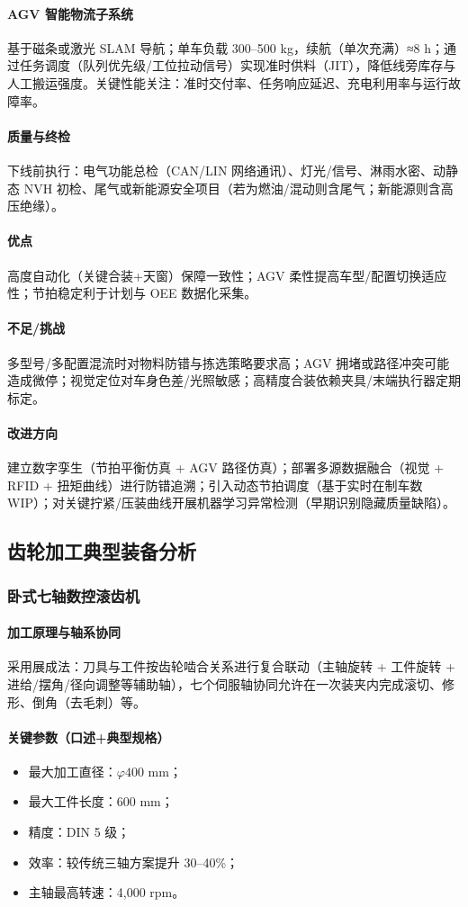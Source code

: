\paragraph{AGV 智能物流子系统} 基于磁条或激光 SLAM 导航；单车负载 300--500 kg，续航（单次充满）≈8 h；通过任务调度（队列优先级/工位拉动信号）实现准时供料（JIT），降低线旁库存与人工搬运强度。关键性能关注：准时交付率、任务响应延迟、充电利用率与运行故障率。
\paragraph{质量与终检} 下线前执行：电气功能总检（CAN/LIN 网络通讯）、灯光/信号、淋雨水密、动静态 NVH 初检、尾气或新能源安全项目（若为燃油/混动则含尾气；新能源则含高压绝缘）。
\paragraph{优点} 高度自动化（关键合装+天窗）保障一致性；AGV 柔性提高车型/配置切换适应性；节拍稳定利于计划与 OEE 数据化采集。
\paragraph{不足/挑战} 多型号/多配置混流时对物料防错与拣选策略要求高；AGV 拥堵或路径冲突可能造成微停；视觉定位对车身色差/光照敏感；高精度合装依赖夹具/末端执行器定期标定。
\paragraph{改进方向} 建立数字孪生（节拍平衡仿真 + AGV 路径仿真）；部署多源数据融合（视觉 + RFID + 扭矩曲线）进行防错追溯；引入动态节拍调度（基于实时在制车数 WIP）；对关键拧紧/压装曲线开展机器学习异常检测（早期识别隐藏质量缺陷）。

\subsection{齿轮加工典型装备分析}
\subsubsection{卧式七轴数控滚齿机}
\paragraph{加工原理与轴系协同} 采用展成法：刀具与工件按齿轮啮合关系进行复合联动（主轴旋转 + 工件旋转 + 进给/摆角/径向调整等辅助轴），七个伺服轴协同允许在一次装夹内完成滚切、修形、倒角（去毛刺）等。
\paragraph{关键参数（口述+典型规格）}\begin{itemize}\item 最大加工直径：\(\varphi 400\) mm；\item 最大工件长度：600 mm；\item 精度：DIN 5 级；\item 效率：较传统三轴方案提升 30--40\%；\item 主轴最高转速：4,000 rpm。\end{itemize}
